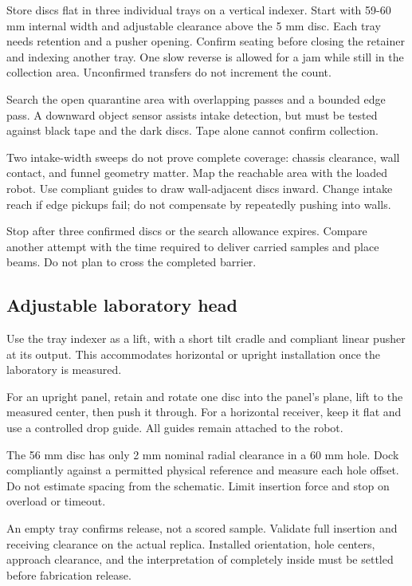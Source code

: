\documentclass[10pt,a4paper]{article}
\begin{document}
Store discs flat in three individual trays on a vertical indexer. Start with 59-60 mm internal width and adjustable clearance above the 5 mm disc. Each tray needs retention and a pusher opening. Confirm seating before closing the retainer and indexing another tray. One slow reverse is allowed for a jam while still in the collection area. Unconfirmed transfers do not increment the count.

Search the open quarantine area with overlapping passes and a bounded edge pass. A downward object sensor assists intake detection, but must be tested against black tape and the dark discs. Tape alone cannot confirm collection.

Two intake-width sweeps do not prove complete coverage: chassis clearance, wall contact, and funnel geometry matter. Map the reachable area with the loaded robot. Use compliant guides to draw wall-adjacent discs inward. Change intake reach if edge pickups fail; do not compensate by repeatedly pushing into walls.

Stop after three confirmed discs or the search allowance expires. Compare another attempt with the time required to deliver carried samples and place beams. Do not plan to cross the completed barrier.

\subsection{Adjustable laboratory head}
Use the tray indexer as a lift, with a short tilt cradle and compliant linear pusher at its output. This accommodates horizontal or upright installation once the laboratory is measured.

For an upright panel, retain and rotate one disc into the panel's plane, lift to the measured center, then push it through. For a horizontal receiver, keep it flat and use a controlled drop guide. All guides remain attached to the robot.

The 56 mm disc has only 2 mm nominal radial clearance in a 60 mm hole. Dock compliantly against a permitted physical reference and measure each hole offset. Do not estimate spacing from the schematic. Limit insertion force and stop on overload or timeout.

An empty tray confirms release, not a scored sample. Validate full insertion and receiving clearance on the actual replica. Installed orientation, hole centers, approach clearance, and the interpretation of completely inside must be settled before fabrication release.
\end{document}
